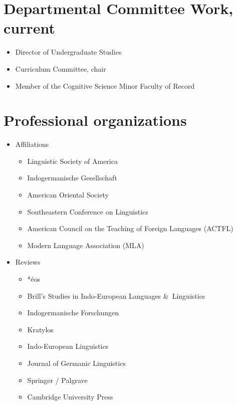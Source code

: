 \documentclass[paper=letter,fontsize=11pt]{scrartcl}
\begin{document}
\section*{Departmental Committee Work, current}

\begin{itemize}
\item Director of Undergraduate Studies
\item Curriculum Committee, chair
\item Member of the Cognitive Science Minor Faculty of Record

\end{itemize}

\section*{Professional organizations}

\begin{itemize}
\item Affiliations
\begin{itemize}
    \item Linguistic Society of America
    \item Indogermanische Gesellschaft
    \item American Oriental Society
    \item Southeastern Conference on Linguistics
    \item American Council on the Teaching of Foreign Languages (ACTFL)
    \item Modern Language Association (MLA)
\end{itemize}
\item Reviews
\begin{itemize}
    \item *\'{e}os
    \item Brill’s Studies in Indo-European Languages \&~Linguistics 
    \item Indogermanische Forschungen
    \item Kratylos
    \item Indo-European Linguistics
    \item Journal of Germanic Linguistics
    \item Springer / Palgrave
    \item Cambridge University Press
\end{itemize}
\end{itemize}
\end{document}
